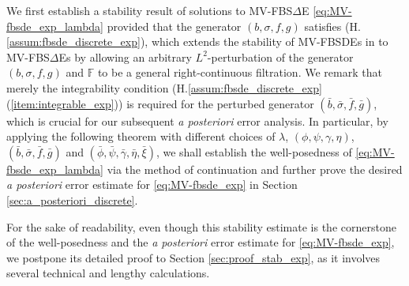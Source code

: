 \documentclass[11pt]{article}
\numberwithin{equation}{section}
\theoremstyle{definition}
\theoremstyle{remark}
\def\sF{{\mathbb{F}}}
\newcommand{\fbsde}{FBS$\Delta$E }
\begin{document}
We first establish a stability result of solutions to MV-\fbsde
\eqref{eq:MV-fbsde_exp_lambda}
provided that the generator $(b,\sigma,f,g)$ satisfies (H.\ref{assum:fbsde_discrete_exp}),
which
 extends the stability of  MV-FBSDEs in \cite[Theorem 5]{bensoussan2015} 
to  MV-FBS$\Delta$Es
by allowing  an arbitrary $L^2$-perturbation of  the  generator $(b,\sigma,f,g)$
and $\sF$ to be a general right-continuous filtration.
We remark that 
merely the integrability condition (H.\ref{assum:fbsde_discrete_exp}(\ref{item:integrable_exp})) is required for the perturbed generator $(\bar{b},\bar{\sigma},\bar{f},\bar{g})$,
which
  is  crucial  for our subsequent \textit{a posteriori} error analysis.
 In particular, 
  by applying the following theorem with different choices of 
$\lambda$, $ (\phi,\psi,\gamma,\eta)$,
  $(\bar{b},\bar{\sigma},\bar{f},\bar{g})$
 and $(\bar{\phi},\bar{\psi},\bar{\gamma},\bar{\eta},\bar{\xi})$,
we shall establish
 the well-posedness of \eqref{eq:MV-fbsde_exp_lambda}
 via the method of continuation 
 and further prove the desired \textit{a posteriori} error estimate for \eqref{eq:MV-fbsde_exp}
 in Section \ref{sec:a_posteriori_discrete}.

For the sake of readability,
even though this stability estimate is the cornerstone of the well-posedness 
and the \textit{a posteriori} error estimate for \eqref{eq:MV-fbsde_exp},
we postpone its detailed proof to Section \ref{sec:proof_stab_exp},
as it involves several technical and lengthy calculations. 
\end{document}
